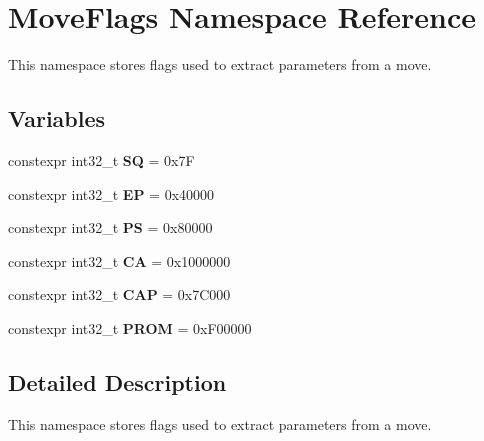 \hypertarget{namespaceMoveFlags}{}\section{Move\+Flags Namespace Reference}
\label{namespaceMoveFlags}


This namespace stores flags used to extract parameters from a move.  


\subsection*{Variables}
\begin{DoxyCompactItemize}
\item 
\mbox{\label{namespaceMoveFlags_a7a96b11dd0c3e88e0ce9b72b54c84c41}} 
constexpr int32\+\_\+t {\bfseries SQ} = 0x7F
\item 
\mbox{\label{namespaceMoveFlags_ab067b1a070bcf23ae247e186f3757316}} 
constexpr int32\+\_\+t {\bfseries EP} = 0x40000
\item 
\mbox{\label{namespaceMoveFlags_af572962024bd7c9c20330cc3bdd8d866}} 
constexpr int32\+\_\+t {\bfseries PS} = 0x80000
\item 
\mbox{\label{namespaceMoveFlags_a9f31abaa59188bb5e9126e6c9374a3e7}} 
constexpr int32\+\_\+t {\bfseries CA} = 0x1000000
\item 
\mbox{\label{namespaceMoveFlags_aa3cdd7b76b32e036a190328e9ed62612}} 
constexpr int32\+\_\+t {\bfseries C\+AP} = 0x7\+C000
\item 
\mbox{\label{namespaceMoveFlags_ae7a9b4000dcdee40996b9283eb329fda}} 
constexpr int32\+\_\+t {\bfseries P\+R\+OM} = 0x\+F00000
\end{DoxyCompactItemize}


\subsection{Detailed Description}
This namespace stores flags used to extract parameters from a move. 
